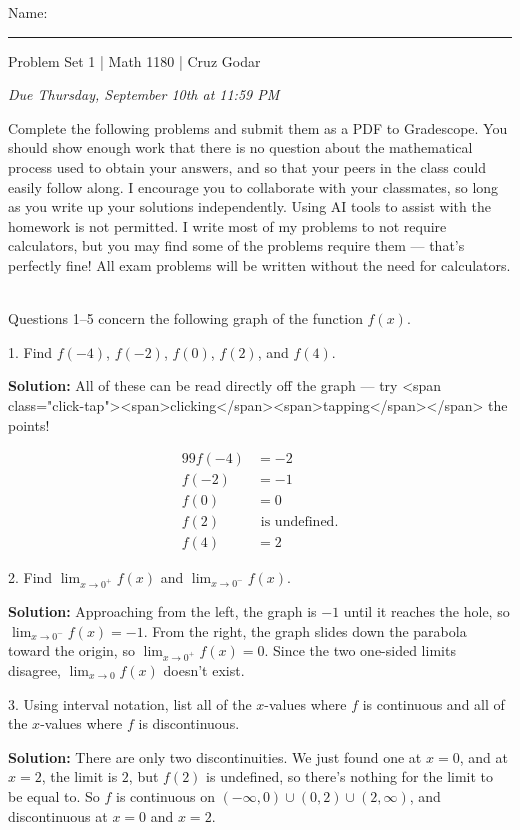 \documentclass{article}
\begin{document}
\Large Name: \rule{2in}{0.15mm} \hfill Problem Set 1 | Math 1180 | Cruz Godar \vspace{4pt}  \normalsize

\textit{Due Thursday, September 10th at 11:59 PM}

Complete the following problems and submit them as a PDF to Gradescope. You should show enough work that there is no question about the mathematical process used to obtain your answers, and so that your peers in the class could easily follow along. I encourage you to collaborate with your classmates, so long as you write up your solutions independently. Using AI tools to assist with the homework is not permitted. I write most of my problems to not require calculators, but you may find some of the problems require them --- that's perfectly fine! All exam problems will be written without the need for calculators.

~\\

Questions 1--5 concern the following graph of the function $f(x)$.

1. Find $f(-4)$, $f(-2)$, $f(0)$, $f(2)$, and $f(4)$.

\textbf{Solution:} All of these can be read directly off the graph --- try <span class="click-tap"><span>clicking</span><span>tapping</span></span> the points!

\begin{alignat*}{99}
	f(-4) &= -2\\
	f(-2) &= -1\\
	f(0) &= 0\\
	f(2) &\text{ is undefined.}\\
	f(4) &= 2
\end{alignat*}

2. Find $\displaystyle \lim_{x \to 0^+} f(x)$ and $\displaystyle \lim_{x \to 0^-} f(x)$.

\textbf{Solution:} Approaching from the left, the graph is $-1$ until it reaches the hole, so $\displaystyle \lim_{x \to 0^-} f(x) = -1.$ From the right, the graph slides down the parabola toward the origin, so $\displaystyle \lim_{x \to 0^+} f(x) = 0.$ Since the two one-sided limits disagree, $\displaystyle \lim_{x \to 0} f(x)$ doesn't exist.

3. Using interval notation, list all of the $x$-values where $f$ is continuous and all of the $x$-values where $f$ is discontinuous.

\textbf{Solution:} There are only two discontinuities. We just found one at $x = 0$, and at $x = 2$, the limit is $2$, but $f(2)$ is undefined, so there's nothing for the limit to be equal to. So $f$ is continuous on $(-\infty, 0) \cup (0, 2) \cup (2, \infty)$, and discontinuous at $x = 0$ and $x = 2$.
\end{document}
